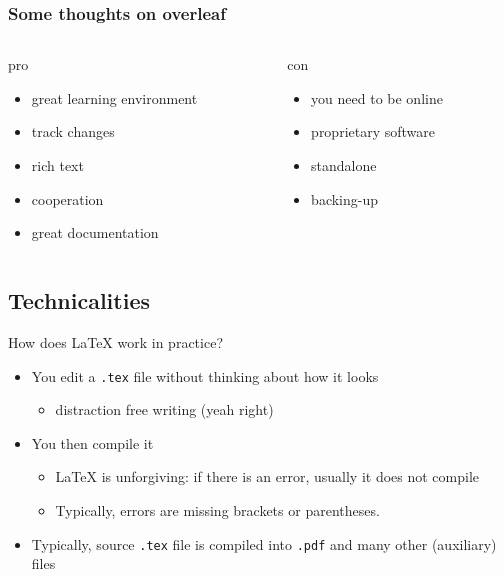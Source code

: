 \documentclass[ignorenonframetext]{beamer}
\begin{document}
\begin{frame}[fragile]
  \frametitle{Some thoughts on overleaf}
  \begin{columns}
    \begin{column}{.5\textwidth}
      \alert{pro}
      \begin{itemize}
        \item great learning environment
        \item track changes
        \item rich text
        \item cooperation
        \item great documentation\pause
      \end{itemize}
    \end{column}
    \begin{column}{.5\textwidth}
      \vspace*{0cm}
      \alert{con}

      \begin{itemize}
        \item you need to be online
        \item proprietary software
        \item standalone
        \item backing-up
      \end{itemize}
    \end{column}
  \end{columns}

\end{frame}

\subsection{Technicalities}\label{technicalities}

\begin{frame}[fragile]{How does \LaTeX{} work in practice?}

\begin{itemize}
\item
  You edit a \texttt{.tex} file without thinking about how it looks

  \begin{itemize}
  \item
    distraction free writing (yeah right)
    \newline
  \end{itemize}
\item
  You then compile it

  \begin{itemize}
  \item
    \LaTeX{} is unforgiving: if there is an error, usually it does not
    compile
  \item
    Typically, errors are missing brackets or parentheses.\newline
  \end{itemize}
\item
  Typically, source \texttt{.tex} file is compiled into \texttt{.pdf} and many
    other (auxiliary) files
\end{itemize}
\end{frame}
\end{document}
